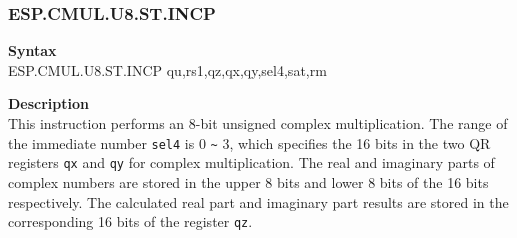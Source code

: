 \newpage
\subsubsection{ESP.CMUL.U8.ST.INCP}\label{instruction:ESPCMULU8STINCP}
\textbf{Syntax}\\
ESP.CMUL.U8.ST.INCP qu,rs1,qz,qx,qy,sel4,sat,rm

\textbf{Description}\\
This instruction performs an 8-bit unsigned complex multiplication. The range of the immediate number \lstinline{sel4} is 0 \verb+~+ 3, which specifies the 16 bits in the two QR registers \lstinline{qx} and \lstinline{qy} for complex multiplication. The real and imaginary parts of complex numbers are stored in the upper 8 bits and lower 8 bits of the 16 bits respectively. The calculated real part and imaginary part results are stored in the corresponding 16 bits of the register \lstinline{qz}.

